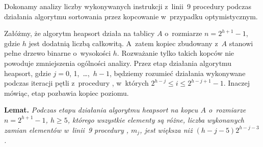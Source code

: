 \exercise %
Dokonamy analizy liczby wykonywanych instrukcji z~linii~9 procedury  podczas działania algorytmu sortowania przez kopcowanie w~przypadku optymistycznym.

Załóżmy, że algorytm heapsort działa na tablicy $A$ o~rozmiarze $n=2^{h+1}-1$, gdzie $h$ jest dodatnią liczbą całkowitą. A~zatem kopiec zbudowany z~$A$ stanowi pełne drzewo binarne o~wysokości $h$. Rozważanie tylko takich kopców nie powoduje zmniejszenia ogólności analizy. Przez  etap działania algorytmu heapsort, gdzie $j=0$, 1,~\dots,~$h-1$, będziemy rozumieć działania wykonywane podczas iteracji pętli  z~procedury , w~których $2^{h-j}\le i\le2^{h-j+1}-1$. Inaczej mówiąc,  etap pozbawia kopiec  poziomu.

\medskip
\noindent\textsf{\textbf{Lemat.}} \textit{Podczas\/  etapu działania algorytmu heapsort na kopcu\/ $A$ o~rozmiarze\/ $n=2^{h+1}-1$,\/ $h\ge5$, którego wszystkie elementy są różne, liczba wykonanych zamian elementów w~linii~9 procedury ,\/ $m_j$, jest większa niż\/ $(h-j-5)2^{h-j-3}$.}
